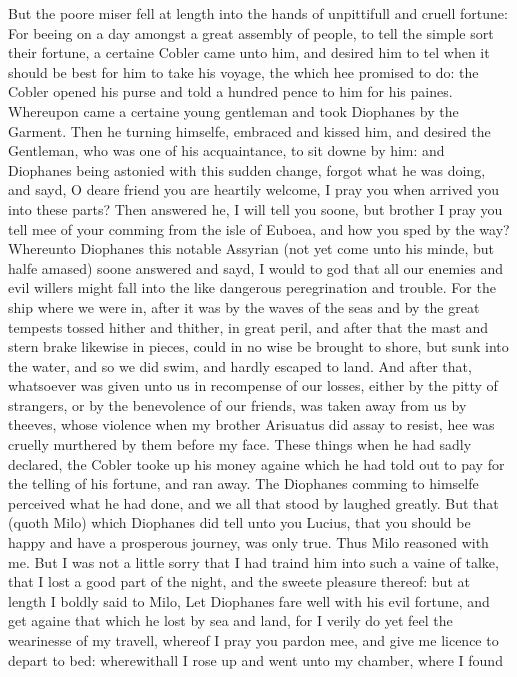 But the poore miser fell at length into the hands of unpittifull and cruell
fortune: For beeing on a day amongst a great assembly of people, to tell the
simple sort their fortune, a certaine Cobler came unto him, and desired him to
tel when it should be best for him to take his voyage, the which hee promised
to do: the Cobler opened his purse and told a hundred pence to him for his
paines. Whereupon came a certaine young gentleman and took Diophanes by the
Garment. Then he turning himselfe, embraced and kissed him, and desired the
Gentleman, who was one of his acquaintance, to sit downe by him: and Diophanes
being astonied with this sudden change, forgot what he was doing, and sayd, O
deare friend you are heartily welcome, I pray you when arrived you into these
parts? Then answered he, I will tell you soone, but brother I pray you tell mee
of your comming from the isle of Euboea, and how you sped by the way? Whereunto
Diophanes this notable Assyrian (not yet come unto his minde, but halfe amased)
soone answered and sayd, I would to god that all our enemies and evil willers
might fall into the like dangerous peregrination and trouble. For the ship
where we were in, after it was by the waves of the seas and by the great
tempests tossed hither and thither, in great peril, and after that the mast and
stern brake likewise in pieces, could in no wise be brought to shore, but sunk
into the water, and so we did swim, and hardly escaped to land. And after that,
whatsoever was given unto us in recompense of our losses, either by the pitty
of strangers, or by the benevolence of our friends, was taken away from us by
theeves, whose violence when my brother Arisuatus did assay to resist, hee was
cruelly murthered by them before my face. These things when he had sadly
declared, the Cobler tooke up his money againe which he had told out to pay for
the telling of his fortune, and ran away. The Diophanes comming to himselfe
perceived what he had done, and we all that stood by laughed greatly. But that
(quoth Milo) which Diophanes did tell unto you Lucius, that you should be happy
and have a prosperous journey, was only true. Thus Milo reasoned with me. But I
was not a little sorry that I had traind him into such a vaine of talke, that I
lost a good part of the night, and the sweete pleasure thereof: but at length I
boldly said to Milo, Let Diophanes fare well with his evil fortune, and get
againe that which he lost by sea and land, for I verily do yet feel the
wearinesse of my travell, whereof I pray you pardon mee, and give me licence to
depart to bed: wherewithall I rose up and went unto my chamber, where I found
